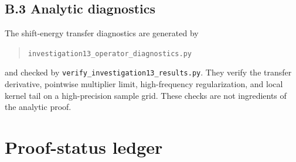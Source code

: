 \documentclass[11pt,a4paper]{article}
\theoremstyle{plain}
\theoremstyle{definition}
\numberwithin{equation}{section}
\begin{document}
\subsection*{B.3 Analytic diagnostics}

The shift-energy transfer diagnostics are generated by
\begin{quote}
\texttt{investigation13\_operator\_diagnostics.py}
\end{quote}
and checked by \texttt{verify\_investigation13\_results.py}. They verify the transfer
derivative, pointwise multiplier limit, high-frequency regularization, and
local kernel tail on a high-precision sample grid. These checks are not
ingredients of the analytic proof.

\section{Proof-status ledger}
\end{document}
